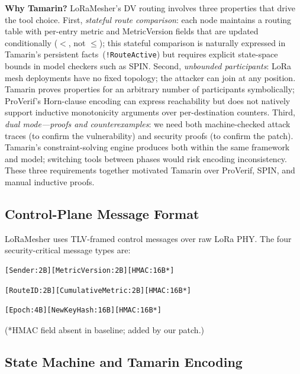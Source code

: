 \documentclass[10pt,journal,compsoc]{IEEEtran}
\begin{document}
\textbf{Why Tamarin?}
LoRaMesher's DV routing involves three properties that drive the
tool choice.
First, \emph{stateful route comparison}: each node maintains a
routing table with per-entry metric and MetricVersion fields that
are updated conditionally ($<$, not $\leq$); this stateful
comparison is naturally expressed in Tamarin's persistent
facts~(\texttt{!RouteActive}) but requires explicit
state-space bounds in model checkers such as SPIN.
Second, \emph{unbounded participants}: LoRa mesh deployments have
no fixed topology; the attacker can join at any position. Tamarin
proves properties for an arbitrary number of participants
symbolically; ProVerif's Horn-clause encoding can express reachability
but does not natively support inductive monotonicity arguments over
per-destination counters.
Third, \emph{dual mode—proofs and counterexamples}: we need both
machine-checked attack traces (to confirm the vulnerability) and
security proofs (to confirm the patch). Tamarin's constraint-solving
engine produces both within the same framework and model;
switching tools between phases would risk encoding inconsistency.
These three requirements together motivated Tamarin over ProVerif,
SPIN, and manual inductive proofs.

\subsection{Control-Plane Message Format}

LoRaMesher uses TLV-framed control messages over raw LoRa PHY.
The four security-critical message types are:

\begin{lstlisting}[caption={Hello (Type=0x00) — broadcast every 10s}]
[Sender:2B][MetricVersion:2B][HMAC:16B*]
\end{lstlisting}
\begin{lstlisting}[caption={RouteReply (Type=0x02) — unicast route response}]
[RouteID:2B][CumulativeMetric:2B][HMAC:16B*]
\end{lstlisting}
\begin{lstlisting}[caption={RekeyNotice (Type=0x03) — session rekeying}]
[Epoch:4B][NewKeyHash:16B][HMAC:16B*]
\end{lstlisting}

\noindent(*HMAC field absent in baseline; added by our patch.)

\subsection{State Machine and Tamarin Encoding}
\end{document}
